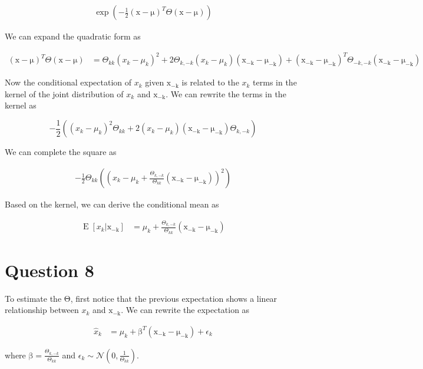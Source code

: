 \documentclass{article}
\newcommand{\vect}[1]{\boldsymbol{\mathrm{#1}}}
\DeclareMathOperator{\E}{E}
\begin{document}
\begin{align*}
\exp \left( - \frac{1}{2} (\vect x - \vect \mu)^T\Theta (\vect x - \vect \mu) \right)
\end{align*}

We can expand the quadratic form as

\begin{align*}
  (\vect x - \vect \mu)^T\Theta (\vect x - \vect \mu) &= \Theta_{kk}(x_k - \mu_k)^2 + 2 \Theta_{k,-k}(x_k - \mu_k)(\vect{x_{-k}} - \vect{\mu_{-k}}) + (\vect{x_{-k}} - \vect{\mu_{-k}})^T\Theta_{-k,-k}(\vect{x_{-k}} - \vect{\mu_{-k}})
\end{align*}

Now the conditional expectation of \(x_k\) given \(\vect{x_{-k}}\) is related to the \(x_k\) terms in the kernel of the joint distribution of \(x_k\) and \(\vect{x_{-k}}\). We can rewrite the terms in the kernel as

\[-\frac{1}{2} \left( {(x_k - \mu_k)^2}{\Theta_{kk}} + 2 {(x_k - \mu_k)(\vect{x_{-k}} - \vect{\mu_{-k}})}{\Theta_{k,-k}}   \right)\]

We can complete the square as

\begin{align*}
  -\frac{1}{2} \Theta_{kk}\left( (x_k - \mu_k + \frac{\Theta_{k,-k}}{\Theta_{kk}}(\vect{x_{-k}} - \vect{\mu_{-k}}))^2  \right)
\end{align*}

Based on the kernel, we can derive the conditional mean as 

\begin{align*}
  \E[x_k | \vect{x_{-k}}] &= \mu_k + \frac{\Theta_{k,-k}}{\Theta_{kk}}(\vect{x_{-k}} - \vect{\mu_{-k}})
\end{align*}

\section*{Question 8}
To estimate the \(\vect \Theta\), first notice that the previous expectation shows a linear relationship between \(x_k\) and \(\vect{x_{-k}}\). We can rewrite the expectation as

\begin{align*}
  \hat x_k &= \mu_k + \vect \beta^T(\vect{x_{-k}} - \vect{\mu_{-k}}) + \epsilon_k
\end{align*}

where \(\vect \beta = \frac{\Theta_{k,-k}}{\Theta_{kk}}\) and \(\epsilon_k \sim \mathcal{N}(0, \frac{1}{\Theta_{kk}})\).
\end{document}
